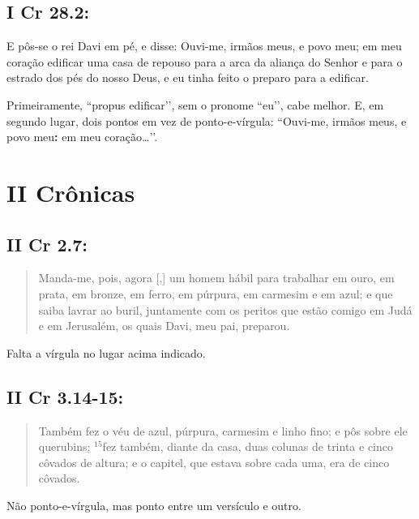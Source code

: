 \subsection*{I Cr 28.2:} 

E pôs-se o rei Davi em pé, e disse: Ouvi-me, irmãos meus, e povo meu\uline{;} em meu coração  edificar uma casa de repouso para a arca da aliança do Senhor e para o estrado dos pés do nosso Deus, e eu tinha feito o preparo para a edificar.
 
Primeiramente, ``propus edificar’’, sem o pronome ``eu’’, cabe
melhor. E, em segundo lugar, dois pontos em vez de ponto-e-vírgula: ``Ouvi-me,
irmãos meus, e povo meu\textbf{:} em meu coração\ldots’’.

\section{II Crônicas}
\subsection*{II Cr 2.7:} 
\begin{quote}
    \small
Manda-me, pois, agora [,] um homem hábil para trabalhar em ouro, em prata, em bronze, em ferro, em púrpura, em carmesim e em azul; e que saiba lavrar ao buril, juntamente com os peritos que estão comigo em Judá e em Jerusalém, os quais Davi, meu pai, preparou.
 \end{quote}
 
Falta a vírgula no lugar acima indicado.

\subsection*{II Cr 3.14-15:} 
\begin{quote}
    \small
Também fez o véu de azul, púrpura, carmesim e linho fino; e pôs sobre ele querubins\uline{;} $^{\mathrm{15}}$fez também, diante da casa, duas colunas de trinta e cinco côvados de altura; e o capitel, que estava sobre cada uma, era de cinco côvados.
 \end{quote}
 
Não ponto-e-vírgula, mas ponto entre um versículo e outro.

